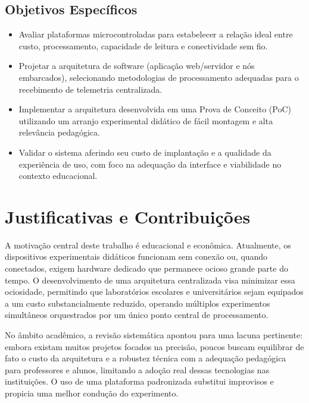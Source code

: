 \documentclass[12pt,a4paper]{article}
\begin{document}
\subsection{Objetivos Específicos}
\begin{itemize}
    \item Avaliar plataformas microcontroladas para estabelecer a relação ideal entre custo, processamento, capacidade de leitura e conectividade sem fio.
    \item Projetar a arquitetura de software (aplicação web/servidor e nós embarcados), selecionando metodologias de processamento adequadas para o recebimento de telemetria centralizada.
    \item Implementar a arquitetura desenvolvida em uma Prova de Conceito (PoC) utilizando um arranjo experimental didático de fácil montagem e alta relevância pedagógica.
    \item Validar o sistema aferindo seu custo de implantação e a qualidade da experiência de uso, com foco na adequação da interface e viabilidade no contexto educacional.
\end{itemize}

\section{Justificativas e Contribuições}

A motivação central deste trabalho é educacional e econômica. Atualmente, os dispositivos experimentais didáticos funcionam sem conexão ou, quando conectados, exigem hardware dedicado que permanece ocioso grande parte do tempo. O desenvolvimento de uma arquitetura centralizada visa minimizar essa ociosidade, permitindo que laboratórios escolares e universitários sejam equipados a um custo substancialmente reduzido, operando múltiplos experimentos simultâneos orquestrados por um único ponto central de processamento.

No âmbito acadêmico, a revisão sistemática apontou para uma lacuna pertinente: embora existam muitos projetos focados na precisão, poucos buscam equilibrar de fato o custo da arquitetura e a robustez técnica com a adequação pedagógica para professores e alunos, limitando a adoção real dessas tecnologias nas instituições. O uso de uma plataforma padronizada substitui improvisos e propicia uma melhor condução do experimento.
\end{document}
